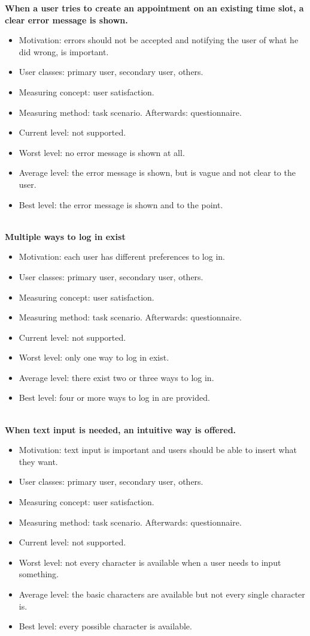 \documentclass[11pt, a4paper,svglistings]{report}
\begin{document}
\textbf{When a user tries to create an appointment on an existing time slot, a clear error message is shown.}
\begin{itemize}
\item{Motivation: errors should not be accepted and notifying the user of what he did wrong, is important.}
\item{User classes: primary user, secondary user, others.}
\item{Measuring concept: user satisfaction.}
\item{Measuring method: task scenario. Afterwards: questionnaire.}
\item{Current level: not supported.}
\item{Worst level: no error message is shown at all.}
\item{Average level: the error message is shown, but is vague and not clear to the user.}
\item{Best level: the error message is shown and to the point. \\ \\}
\end{itemize}
\textbf{Multiple ways to log in exist}
\begin{itemize}
\item{Motivation: each user has different preferences to log in.}
\item{User classes: primary user, secondary user, others.}
\item{Measuring concept: user satisfaction.}
\item{Measuring method: task scenario. Afterwards: questionnaire.}
\item{Current level: not supported.}
\item{Worst level: only one way to log in exist.}
\item{Average level: there exist two or three ways to log in.}
\item{Best level: four or more ways to log in are provided. \\ \\}
\end{itemize}
\textbf{When text input is needed, an intuitive way is offered.}
\begin{itemize}
\item{Motivation: text input is important and users should be able to insert what they want.}
\item{User classes: primary user, secondary user, others.}
\item{Measuring concept: user satisfaction.}
\item{Measuring method: task scenario. Afterwards: questionnaire.}
\item{Current level: not supported.}
\item{Worst level: not every character is available when a user needs to input something.}
\item{Average level: the basic characters are available but not every single character is.}
\item{Best level: every possible character is available. \\ \\}
\end{itemize}
\end{document}
